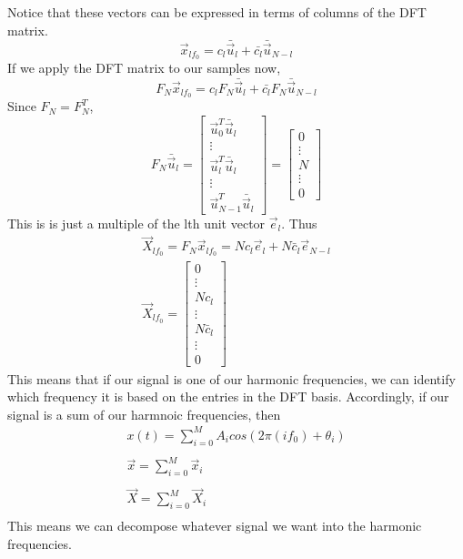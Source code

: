 \documentclass{article}
\begin{document}
Notice that these vectors can be expressed in terms of columns of the DFT matrix.
$$\vec{x}_{lf_0} = c_l\bar{\vec{u}}_l+\bar{c_l}\bar{\vec{u}}_{N-l}$$
If we apply the DFT matrix to our samples now, 
$$F_N\vec{x}_{lf_0} = c_lF_N\bar{\vec{u}}_l+\bar{c_l}F_N\bar{\vec{u}}_{N-l}$$
Since $F_N=F_N^T$,
\[
    F_N\bar{\vec{u}}_l = \left[
        \begin{array}{c}
            \vec{u}_0^T\bar{\vec{u}}_l\\
            \vdots\\
            \vec{u}_l^T\bar{\vec{u}}_l\\
            \vdots\\
            \vec{u}_{N-1}^T\bar{\vec{u}}_l
        \end{array}
    \right] = \left[
        \begin{array}{c}
            0\\
            \vdots\\
            N\\
            \vdots\\
            0
        \end{array}
    \right]
\]
This is is just a multiple of the lth unit vector $\vec{e}_l$.
Thus
\[
    \begin{array}{c}
        \vec{X}_{lf_0} = F_N\vec{x}_{lf_0} = Nc_l\vec{e}_l+N\bar{c}_l\vec{e}_{N-l}\\
        \vec{X}_{lf_0} = \left[
            \begin{array}{c}
                0\\
                \vdots\\
                Nc_l\\
                \vdots\\
                N\bar{c}_l\\
                \vdots\\
                0
            \end{array}
        \right]
    \end{array}
\]
This means that if our signal is one of our harmonic frequencies, 
we can identify which frequency it is based on the entries in the DFT basis.
Accordingly, if our signal is a sum of our harmnoic frequencies, then
\[
    \begin{array}{c}
        x(t) = \sum_{i=0}^{M}{A_icos(2\pi(if_0)+\theta_i)}\\\\
        \vec{x} = \sum_{i=0}^{M}{\vec{x}_i}\\\\
        \vec{X} = \sum_{i=0}^{M}{\vec{X}_i}\\
    \end{array}
\]
This means we can decompose whatever signal we want into the harmonic frequencies.
\end{document}
